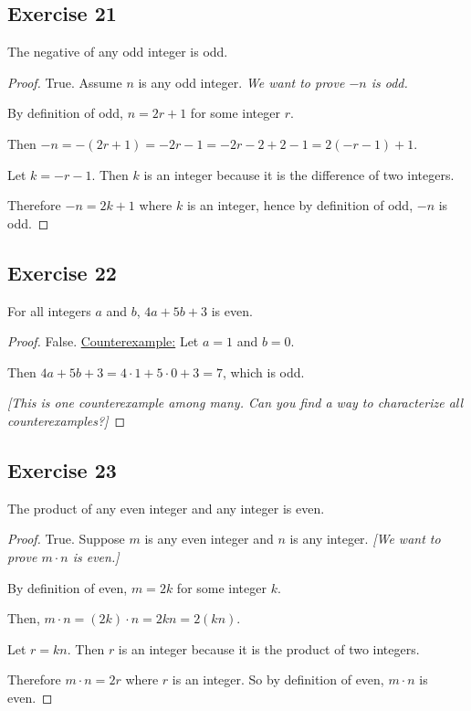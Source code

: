 \documentclass[14pt]{extarticle}
\begin{document}
\subsection{Exercise 21}
The negative of any odd integer is odd.

\begin{proof}
True. Assume $n$ is any odd integer. {\it We want to prove $-n$ is odd.}

By definition of odd, $n = 2r + 1$ for some integer $r$. 

Then $-n = -(2r+1) = -2r-1 = -2r-2+2-1 = 2(-r-1) + 1$.

Let $k = -r-1$. Then $k$ is an integer because it is the difference of two integers.

Therefore $-n = 2k+1$ where $k$ is an integer, hence by definition of odd, $-n$ is odd.
\end{proof}

\subsection{Exercise 22}
For all integers $a$ and $b$, $4a + 5b + 3$ is even.

\begin{proof}
False. \underline{Counterexample:} Let $a = 1$ and $b = 0$. 

Then $4a + 5b + 3 = 4\cdot 1 + 5\cdot 0 + 3 = 7$, which is odd. 

{\it [This is one counterexample among many. Can you find a way to characterize all counterexamples?]}
\end{proof}

\subsection{Exercise 23}
The product of any even integer and any integer is even.

\begin{proof}
True. Suppose $m$ is any even integer and $n$ is any integer. {\it [We want to prove $m \cdot n$ is even.]}

By definition of even, $m = 2k$ for some integer $k$.

Then, $m \cdot n = (2k) \cdot n = 2kn = 2(kn)$.

Let $r = kn$. Then $r$ is an integer because it is the product of two integers.

Therefore $m\cdot n = 2r$ where $r$ is an integer. So by definition of even, $m \cdot n$ is even.
\end{proof}
\end{document}
